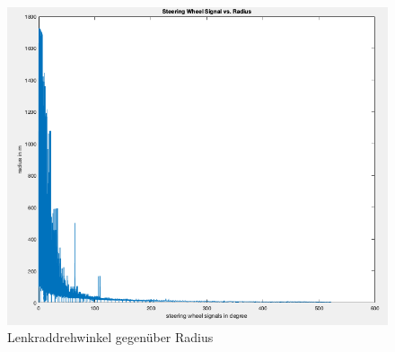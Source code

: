 		\begin{figure}[h!]
		\centering
		\includegraphics[width=1\linewidth]{../Graphiken/sorted_sw}
		\caption{Lenkraddrehwinkel gegenüber Radius}
		\label{fig:sorted_sw}
	\end{figure}
\pagebreak

